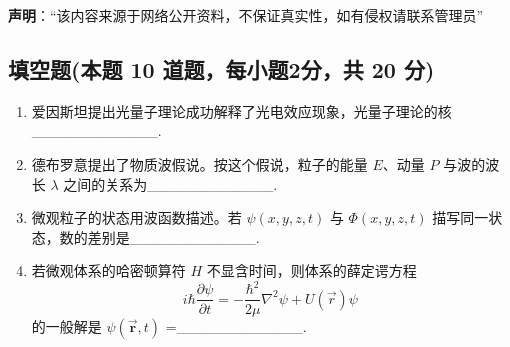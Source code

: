 
\textbf{声明}：“该内容来源于网络公开资料，不保证真实性，如有侵权请联系管理员”

\subsection{填空题(本题 10 道题，每小题2分，共 20 分)}
\begin{enumerate}
\item 爱因斯坦提出光量子理论成功解释了光电效应现象，光量子理论的核____________.
\item 德布罗意提出了物质波假说。按这个假说，粒子的能量 $E$、动量 $P$ 与波的波长 $\lambda$ 之间的关系为____________.
\item 微观粒子的状态用波函数描述。若 $\psi(x,y,z,t)$ 与 $\Phi(x,y,z,t)$ 描写同一状态，数的差别是____________.
\item 若微观体系的哈密顿算符 $H$ 不显含时间，则体系的薛定谔方程 
   $$i \hbar \frac{\partial \psi}{\partial t} = -\frac{\hbar^2}{2 \mu} \nabla^2 \psi + U(\vec r) \psi~$$
    的一般解是 $\psi(\mathbf{\vec r},t)$ =____________.
\end{enumerate}
